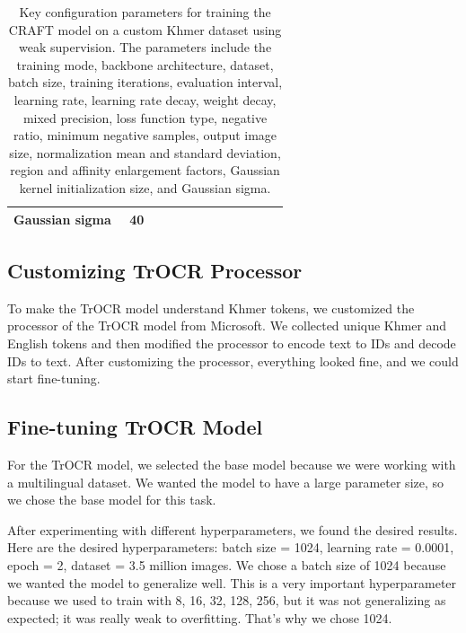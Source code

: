 \begin{table}[ht]
\begin{tabular}{|p{0.4\linewidth}|p{0.55\linewidth}|}
Gaussian sigma & 40 \\
\hline
\end{tabular}
\caption{Key configuration parameters for training the CRAFT model on a custom Khmer dataset 
using weak supervision. The parameters include the training mode, backbone architecture, 
dataset, batch size, training iterations, evaluation interval, learning rate, learning rate decay, 
weight decay, mixed precision, loss function type, negative ratio, minimum negative samples, 
output image size, normalization mean and standard deviation, region and affinity enlargement 
factors, Gaussian kernel initialization size, and Gaussian sigma.}
\label{tab:craft-training-config}
\end{table}


\subsection{Customizing TrOCR Processor}
\label{subsec:customizing-trocr-processor}
To make the TrOCR model understand Khmer tokens, we customized the processor of the TrOCR 
model from Microsoft. We collected unique Khmer and English tokens and then modified the 
processor to encode text to IDs and decode IDs to text. After customizing the processor, 
everything looked fine, and we could start fine-tuning.

\subsection{Fine-tuning TrOCR Model}
\label{subsec:fine-tuning-trocr-model}
For the TrOCR model, we selected the base model because we were working with a multilingual 
dataset. We wanted the model to have a large parameter size, so we chose the base model for 
this task.

After experimenting with different hyperparameters, we found the desired results. Here are the 
desired hyperparameters: batch size = 1024, learning rate = 0.0001, epoch = 2, dataset = 3.5 
million images. We chose a batch size of 1024 because we wanted the model to generalize well. 
This is a very important hyperparameter because we used to train with 8, 16, 32, 128, 256, 
but it was not generalizing as expected; it was really weak to overfitting. That's why we 
chose 1024.

